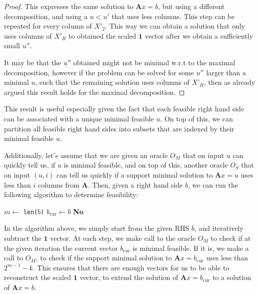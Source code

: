 \documentclass{article}
\begin{document}
\begin{adjustwidth}{10pt}{10pt}
\begin{proof}
This expresses the same solution to $\mathbf{A}x = b$, but using a different decomposition, and using a $u<u'$ that uses less columns. This step can be repeated for every column of $X'_2$. This way we can obtain a solution that only uses columns of $X'_R$ to obtained the scaled $\mathbf{1}$ vector after we obtain a sufficiently small $u''$. 

It may be that the $u''$ obtained might not be minimal w.r.t to the maximal decomposition, however if the problem can be solved for some $u''$ larger than a minimal $u$, such that the remaining solution uses columns of $X'_R$, then as already argued this result holds for the maximal decomposition. 
\end{proof}
\end{adjustwidth}
This result is useful especially given the fact that each feasible right hand side can be associated with a unique minimal feasible $u$. On top of this, we can partition all feasible right hand sides into subsets that are indexed by their minimal feasible $u$.

Additionally, let's assume that we are given an oracle $O_M$ that on input $ u $ can quickly tell us, if $ u $ is minimal feasible, and on top of this, another oracle $O_S$ that on input $(u, i)$ can tell us quickly if a support minimal solution to $ \mathbf{A}x = u $ uses less than $ i $ columns from $ \mathbf{A} $.  Then, given a right hand side $b$, we can run the following algorithm to determine feasibility:

\IncMargin{2em}
\begin{algorithm}
	\BlankLine
	$ m \gets  $ \texttt{len($ b $)}\;
	$b_\text{cur}\gets b$\;
\Return \textbf{No}
\end{algorithm}\DecMargin{2em}
In the algorithm above, we simply start from the given RHS $ b $, and iteratively subtract the $\mathbf{1}$ vector. At each step, we make call to the oracle $ O_M $ to check if at the given iteration the current vector $ b_\text{cur} $ is minimal feasible. If it is, we make a call to $ O_M $, to check if the support minimal solution to $ \mathbf{A}x = b_\text{cur} $ uses less than  $ 2^{m-1}-k $. This ensures that there are enough vectors for us to be able to reconstruct the scaled $ \mathbf{1} $ vector, to extend the solution of $ \mathbf{A}x = b_\text{cur} $ to a solution of $ \mathbf{A}x = b $.
\end{document}
